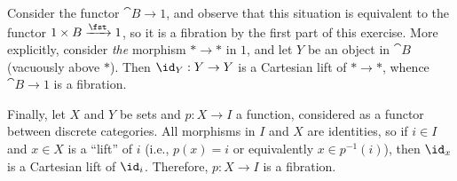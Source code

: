 \begin{solution}
Consider the functor \(\cat{B} \to 1\), and observe that this situation is equivalent to the functor \(1 \times B \xrightarrow{\fst} 1\), so it is a fibration by the first part of this exercise.
More explicitly, consider \emph{the} morphism \(* \to *\) in \(1\), and let \(Y\) be an object in \(\cat{B}\) (vacuously above \(*\)).
Then \(\id_Y : Y \to Y\) is a Cartesian lift of \(* \to *\), whence \(\cat{B} \to 1\) is a fibration.

Finally, let \(X\) and \(Y\) be sets and \(p : X \to I\) a function, considered as a functor between discrete categories.
All morphisms in \(I\) and \(X\) are identities, so if \(i \in I\) and \(x \in X\) is a ``lift'' of \(i\) (i.e., \(p(x) = i\) or equivalently \(x \in p^{-1}(i)\)), then \(\id_x\) is a Cartesian lift of \(\id_i\).
Therefore, \(p : X \to I\) is a fibration.
\end{solution}